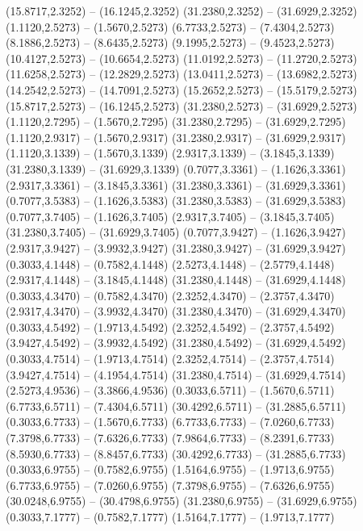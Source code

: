 {\begin{scope}[shift={(#1,#2)}]
    (15.8717,2.3252) -- (16.1245,2.3252)
    (31.2380,2.3252) -- (31.6929,2.3252)
    (1.1120,2.5273) -- (1.5670,2.5273)
    (6.7733,2.5273) -- (7.4304,2.5273)
    (8.1886,2.5273) -- (8.6435,2.5273)
    (9.1995,2.5273) -- (9.4523,2.5273)
    (10.4127,2.5273) -- (10.6654,2.5273)
    (11.0192,2.5273) -- (11.2720,2.5273)
    (11.6258,2.5273) -- (12.2829,2.5273)
    (13.0411,2.5273) -- (13.6982,2.5273)
    (14.2542,2.5273) -- (14.7091,2.5273)
    (15.2652,2.5273) -- (15.5179,2.5273)
    (15.8717,2.5273) -- (16.1245,2.5273)
    (31.2380,2.5273) -- (31.6929,2.5273)
    (1.1120,2.7295) -- (1.5670,2.7295)
    (31.2380,2.7295) -- (31.6929,2.7295)
    (1.1120,2.9317) -- (1.5670,2.9317)
    (31.2380,2.9317) -- (31.6929,2.9317)
    (1.1120,3.1339) -- (1.5670,3.1339)
    (2.9317,3.1339) -- (3.1845,3.1339)
    (31.2380,3.1339) -- (31.6929,3.1339)
    (0.7077,3.3361) -- (1.1626,3.3361)
    (2.9317,3.3361) -- (3.1845,3.3361)
    (31.2380,3.3361) -- (31.6929,3.3361)
    (0.7077,3.5383) -- (1.1626,3.5383)
    (31.2380,3.5383) -- (31.6929,3.5383)
    (0.7077,3.7405) -- (1.1626,3.7405)
    (2.9317,3.7405) -- (3.1845,3.7405)
    (31.2380,3.7405) -- (31.6929,3.7405)
    (0.7077,3.9427) -- (1.1626,3.9427)
    (2.9317,3.9427) -- (3.9932,3.9427)
    (31.2380,3.9427) -- (31.6929,3.9427)
    (0.3033,4.1448) -- (0.7582,4.1448)
    (2.5273,4.1448) -- (2.5779,4.1448)
    (2.9317,4.1448) -- (3.1845,4.1448)
    (31.2380,4.1448) -- (31.6929,4.1448)
    (0.3033,4.3470) -- (0.7582,4.3470)
    (2.3252,4.3470) -- (2.3757,4.3470)
    (2.9317,4.3470) -- (3.9932,4.3470)
    (31.2380,4.3470) -- (31.6929,4.3470)
    (0.3033,4.5492) -- (1.9713,4.5492)
    (2.3252,4.5492) -- (2.3757,4.5492)
    (3.9427,4.5492) -- (3.9932,4.5492)
    (31.2380,4.5492) -- (31.6929,4.5492)
    (0.3033,4.7514) -- (1.9713,4.7514)
    (2.3252,4.7514) -- (2.3757,4.7514)
    (3.9427,4.7514) -- (4.1954,4.7514)
    (31.2380,4.7514) -- (31.6929,4.7514)
    (2.5273,4.9536) -- (3.3866,4.9536)
    (0.3033,6.5711) -- (1.5670,6.5711)
    (6.7733,6.5711) -- (7.4304,6.5711)
    (30.4292,6.5711) -- (31.2885,6.5711)
    (0.3033,6.7733) -- (1.5670,6.7733)
    (6.7733,6.7733) -- (7.0260,6.7733)
    (7.3798,6.7733) -- (7.6326,6.7733)
    (7.9864,6.7733) -- (8.2391,6.7733)
    (8.5930,6.7733) -- (8.8457,6.7733)
    (30.4292,6.7733) -- (31.2885,6.7733)
    (0.3033,6.9755) -- (0.7582,6.9755)
    (1.5164,6.9755) -- (1.9713,6.9755)
    (6.7733,6.9755) -- (7.0260,6.9755)
    (7.3798,6.9755) -- (7.6326,6.9755)
    (30.0248,6.9755) -- (30.4798,6.9755)
    (31.2380,6.9755) -- (31.6929,6.9755)
    (0.3033,7.1777) -- (0.7582,7.1777)
    (1.5164,7.1777) -- (1.9713,7.1777)

\end{scope}}
